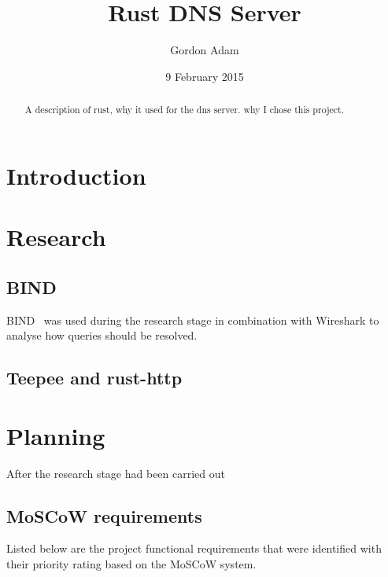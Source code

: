 \documentclass{l3proj}
\begin{document}
\setcounter{secnumdepth}{3}
\setcounter{tocdepth}{3}
\title{Rust DNS Server}
\author{Gordon Adam}
\date{9 February 2015}
\maketitle
\begin{abstract}

A description of rust, why it used for the dns server. why I chose this project.

\end{abstract}
\educationalconsent
\tableofcontents
\chapter{Introduction}
\label{intro}

\chapter{Research}
\label{Research}

\section{BIND}

BIND~\cite{bind} was used during the research stage in combination with Wireshark to analyse how queries should be resolved.  

\section{Teepee and rust-http}


\chapter{Planning}
\label{Planning}

After the research stage had been carried out 

\section{MoSCoW requirements}
Listed below are the project functional requirements that were identified with their priority rating based on the MoSCoW system.
\end{document}
